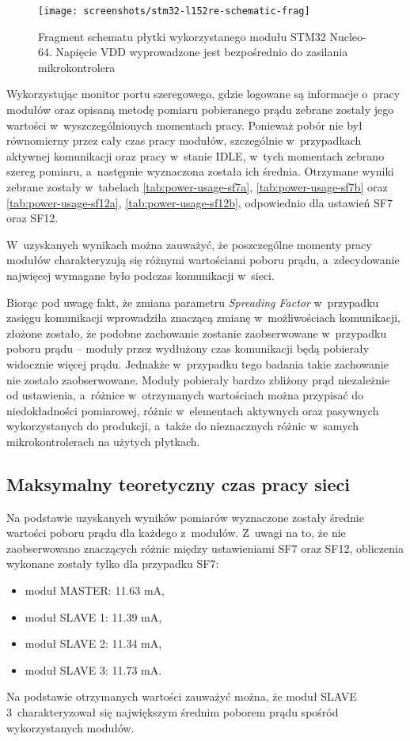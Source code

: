 \begin{figure}[!htbp]
    \centering
    \texttt{[image: screenshots/stm32-l152re-schematic-frag]}
    \caption{\label{img:stm32-l152re-schematic-frag}Fragment schematu płytki wykorzystanego modułu STM32 Nucleo-64.
        Napięcie VDD wyprowadzone jest bezpośrednio do zasilania mikrokontrolera}
\end{figure}

\FloatBarrier

Wykorzystując monitor portu szeregowego, gdzie logowane są informacje o~pracy modułów oraz opisaną metodę pomiaru
pobieranego prądu zebrane zostały jego wartości w~wyszczególnionych momentach pracy. Ponieważ pobór nie był równomierny
przez cały czas pracy modułów, szczególnie w~przypadkach aktywnej komunikacji oraz pracy w~stanie IDLE, w~tych momentach
zebrano szereg pomiaru, a~następnie wyznaczona została ich średnia. Otrzymane wyniki zebrane zostały w~tabelach
\ref{tab:power-usage-sf7a}, \ref{tab:power-usage-sf7b} oraz \ref{tab:power-usage-sf12a}, \ref{tab:power-usage-sf12b},
odpowiednio dla ustawień SF7 oraz SF12.




\FloatBarrier
W~uzyskanych wynikach można zauważyć, że poszczególne momenty pracy modułów charakteryzują się różnymi wartościami
poboru prądu, a~zdecydowanie najwięcej wymagane było podczas komunikacji w~sieci.

Biorąc pod uwagę fakt, że zmiana parametru \textsl{Spreading Factor} w~przypadku zasięgu komunikacji wprowadziła znaczącą zmianę
w~możliwościach komunikacji, złożone zostało, że podobne zachowanie zostanie zaobserwowane w~przypadku poboru prądu --
moduły przez wydłużony czas komunikacji będą pobierały widocznie więcej prądu. Jednakże w~przypadku tego badania takie
zachowanie nie zostało zaobserwowane. Moduły pobierały bardzo zbliżony prąd niezależnie od ustawienia, a~różnice
w~otrzymanych wartościach można przypisać do niedokładności pomiarowej, różnic w~elementach aktywnych oraz pasywnych
wykorzystanych do produkcji, a~także do nieznacznych różnic w~samych mikrokontrolerach na użytych płytkach.

\subsection{\label{sect:network-work-on-battery}Maksymalny teoretyczny czas pracy sieci} Na podstawie uzyskanych wyników
pomiarów wyznaczone zostały średnie wartości poboru prądu dla każdego z~modułów. Z~uwagi na to, że nie zaobserwowano
znaczących różnic między ustawieniami SF7 oraz SF12, obliczenia wykonane zostały tylko dla przypadku SF7:
\begin{itemize}[label=--]
    \item moduł MASTER: 11.63 mA,
    \item moduł SLAVE 1: 11.39 mA,
    \item moduł SLAVE 2: 11.34 mA,
    \item moduł SLAVE 3: 11.73 mA.
\end{itemize}
Na podstawie otrzymanych wartości zauważyć można, że moduł SLAVE 3~charakteryzował się największym średnim poborem prądu
spośród wykorzystanych modułów.

